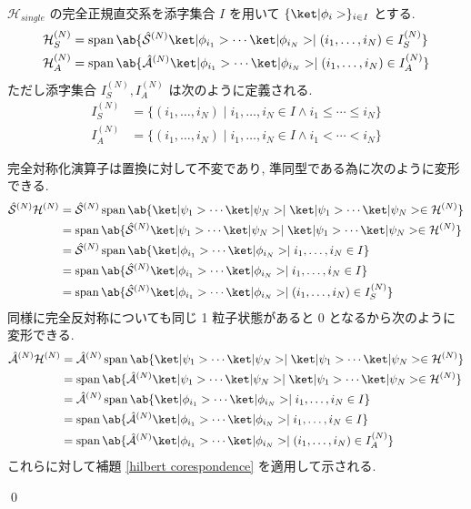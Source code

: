 \documentclass[uplatex,dvipdfmx,a4paper,11pt]{jlreq}
\makeatletter
\DeclareMathOperator{\Span}{span}
\newcommand{\HH}{\mathcal{H}}
\renewcommand{\S}{\mathcal{S}}
\newcommand{\A}{\mathcal{A}}
\numberwithin{equation}{section}
\theoremstyle{definition}
\renewenvironment{proof}[1][\proofname]{\par
  \normalfont
  \topsep6\p@\@plus6\p@ \trivlist
  \item[\hskip\labelsep{\bfseries #1}\@addpunct{\bfseries}]\ignorespaces\quad\par
}{
  \qed\endtrivlist\@endpefalse
}
\renewcommand\proofname{証明}
\makeatother
\begin{document}
\begin{proposition}[Q21-16(i)(ii), Q21-17(i)(ii), Q21-18(i)(ii)]
  $\HH_{single}$ の完全正規直交系を添字集合 $I$ を用いて $\{\ket|\phi_i>\}_{i\in I}$ とする.
  \begin{align}
    \HH_S^{(N)} & = \Span\ab\{\hat{\S}^{(N)}\ket|\phi_{i_1}>\cdots\ket|\phi_{i_N}> \mid (i_1,\ldots,i_N)\in I_S^{(N)} \} \\
    \HH_A^{(N)} & = \Span\ab\{\hat{\A}^{(N)}\ket|\phi_{i_1}>\cdots\ket|\phi_{i_N}> \mid (i_1,\ldots,i_N)\in I_A^{(N)} \}
  \end{align}
  ただし添字集合 $I_S^{(N)}, I_A^{(N)}$ は次のように定義される.
  \begin{align}
    I_S^{(N)} & = \{(i_1,\ldots,i_N)\mid i_1,\ldots,i_N\in I\land i_1\leq\cdots\leq i_{N}\} \\
    I_A^{(N)} & = \{(i_1,\ldots,i_N)\mid i_1,\ldots,i_N\in I\land i_1<\cdots<i_{N}\}
  \end{align}
\end{proposition}
\begin{proof}
  完全対称化演算子は置換に対して不変であり, 準同型である為に次のように変形できる.
  \begin{align}
    \hat{\S}^{(N)}\HH^{(N)} & = \hat{\S}^{(N)}\Span\ab\{\ket|\psi_1>\cdots\ket|\psi_N> \mid \ket|\psi_1>\cdots\ket|\psi_N>\in\HH^{(N)} \} \\
                            & = \Span\ab\{\hat{\S}^{(N)}\ket|\psi_1>\cdots\ket|\psi_N> \mid \ket|\psi_1>\cdots\ket|\psi_N>\in\HH^{(N)} \} \\
                            & = \hat{\S}^{(N)}\Span\ab\{\ket|\phi_{i_1}>\cdots\ket|\phi_{i_N}> \mid i_1,\ldots,i_N\in I\}                 \\
                            & = \Span\ab\{\hat{\S}^{(N)}\ket|\phi_{i_1}>\cdots\ket|\phi_{i_N}> \mid i_1,\ldots,i_N\in I\}                 \\
                            & = \Span\ab\{\hat{\S}^{(N)}\ket|\phi_{i_1}>\cdots\ket|\phi_{i_N}> \mid (i_1,\ldots,i_N)\in I_S^{(N)} \}
  \end{align}
  同様に完全反対称についても同じ 1 粒子状態があると 0 となるから次のように変形できる.
  \begin{align}
    \hat{\A}^{(N)}\HH^{(N)} & = \hat{\A}^{(N)}\Span\ab\{\ket|\psi_1>\cdots\ket|\psi_N> \mid \ket|\psi_1>\cdots\ket|\psi_N>\in\HH^{(N)} \} \\
                            & = \Span\ab\{\hat{\A}^{(N)}\ket|\psi_1>\cdots\ket|\psi_N> \mid \ket|\psi_1>\cdots\ket|\psi_N>\in\HH^{(N)} \} \\
                            & = \hat{\A}^{(N)}\Span\ab\{\ket|\phi_{i_1}>\cdots\ket|\phi_{i_N}> \mid i_1,\ldots,i_N\in I \}                \\
                            & = \Span\ab\{\hat{\A}^{(N)}\ket|\phi_{i_1}>\cdots\ket|\phi_{i_N}> \mid i_1,\ldots,i_N\in I \}                \\
                            & = \Span\ab\{\hat{\A}^{(N)}\ket|\phi_{i_1}>\cdots\ket|\phi_{i_N}> \mid (i_1,\ldots,i_N)\in I_A^{(N)} \}
  \end{align}
  これらに対して補題 \ref{hilbert corespondence} を適用して示される.
\end{proof}
\end{document}
